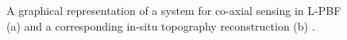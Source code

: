\begin{figure}
    \centering
    \qquad
    \caption[Co-axial sensing and results.]{A graphical representation of a system for co-axial sensing in L-PBF \cite{colosimo_-machine_2020} (a) and a corresponding in-situ topography reconstruction (b) \cite{neef_low_2014}.}
\end{figure}
